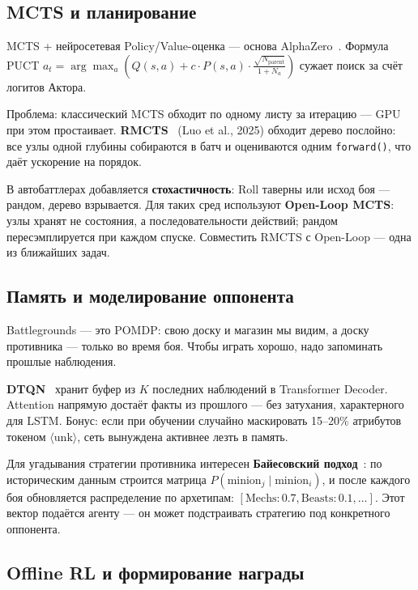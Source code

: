 \documentclass[a4paper,12pt]{extarticle}
\begin{document}
\subsection{MCTS и планирование}

MCTS + нейросетевая Policy/Value-оценка --- основа AlphaZero~\cite{muzero}. Формула PUCT $a_t = \arg\max_a (Q(s,a) + c \cdot P(s,a) \cdot \frac{\sqrt{N_{\text{parent}}}}{1 + N_a})$ сужает поиск за счёт логитов Актора.

Проблема: классический MCTS обходит по одному листу за итерацию --- GPU при этом простаивает. \textbf{RMCTS}~\cite{rmcts} (Luo et al., 2025) обходит дерево послойно: все узлы одной глубины собираются в батч и оцениваются одним \texttt{forward()}, что даёт ускорение на порядок.

В автобаттлерах добавляется \textbf{стохастичность}: Roll таверны или исход боя --- рандом, дерево взрывается. Для таких сред используют \textbf{Open-Loop MCTS}: узлы хранят не состояния, а последовательности действий; рандом пересэмплируется при каждом спуске. Совместить RMCTS с Open-Loop --- одна из ближайших задач.

\subsection{Память и моделирование оппонента}

Battlegrounds --- это POMDP: свою доску и магазин мы видим, а доску противника --- только во время боя. Чтобы играть хорошо, надо запоминать прошлые наблюдения.

\textbf{DTQN}~\cite{dtqn} хранит буфер из $K$ последних наблюдений в Transformer Decoder. Attention напрямую достаёт факты из прошлого --- без затухания, характерного для LSTM. Бонус: если при обучении случайно маскировать 15--20\% атрибутов токеном $\langle\text{unk}\rangle$, сеть вынуждена активнее лезть в память.

Для угадывания стратегии противника интересен \textbf{Байесовский подход}~\cite{opponent}: по историческим данным строится матрица $P(\text{minion}_j \mid \text{minion}_i)$, и после каждого боя обновляется распределение по архетипам: $[\text{Mechs}: 0.7, \text{Beasts}: 0.1, \ldots]$. Этот вектор подаётся агенту --- он может подстраивать стратегию под конкретного оппонента.

\subsection{Offline RL и формирование награды}
\end{document}
